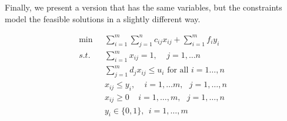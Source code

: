 Finally, we present a version that has the same variables, but the constraints model the feasible solutions in a slightly different way.

\begin{align*}
\min \ \ \ & \sum_{i = 1}^m\sum_{j=1}^n c_{ij}x_{ij}+\sum_{i = 1}^mf_iy_i\\
s.t.&  \sum_{i = 1}^mx_{ij} = 1,~~~~~j =1,\ldots n\\
& \displaystyle \sum_{j=1}^md_jx_{ij}\leqslant u_i\text{ for all }i=1\dots,n \tag{capacity of facility $i$}\\
&x_{ij}\leq y_i,~~~~~ i = 1,\ldots m,~~~ j = 1,\ldots,n\\
&  x_{ij} \geq 0~~~~~ i = 1,\ldots,m, ~~~j = 1,\ldots,n\\
& y_i\in \{0,1\}, \  \  i = 1,\ldots,m
\end{align*}

